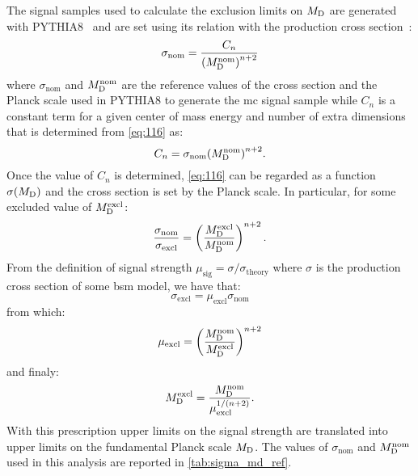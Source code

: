 The signal samples used to calculate the exclusion limits on $M_\mathrm{D}$ are generated
with PYTHIA8~\cite{PYTHIA8} and are set using its relation with the production
cross section~\cite{ADDPhenomenology}:
\begin{equation}
  \label{eq:116}
  \sigma_\mathrm{nom} = \frac{C_n}{{(M_\mathrm{D}^\mathrm{nom})}^{n + 2}}
\end{equation}
where $\sigma_\mathrm{nom}$ and $M_\mathrm{D}^\mathrm{nom}$ are the reference values of
the cross section and the Planck scale used in PYTHIA8 to generate the \gls{mc}
signal sample while $C_n$ is a constant term for a given center of mass energy
and number of extra dimensions that is determined from \cref{eq:116} as:
\begin{equation}
  \label{eq:179}
  C_n = \sigma_\mathrm{nom} {(M_\mathrm{D}^\mathrm{nom})}^{n + 2}.
\end{equation}
Once the value of $C_n$ is determined, \cref{eq:116} can be regarded as a
function $\sigma(M_\mathrm{D})$ and the cross section is set by the Planck scale. In
particular, for some excluded value of $M_\mathrm{D}^\mathrm{excl}$:
\begin{equation}
  \label{eq:180}
  \frac{\sigma_\mathrm{nom}}{\sigma_\mathrm{excl}} = \left(
    \frac{M_\mathrm{D}^\mathrm{excl}}{M_\mathrm{D}^\mathrm{nom}} \right)^{n + 2}.
\end{equation}
From the definition of signal strength
$\mu_\mathrm{sig} = \sigma/\sigma_\mathrm{theory}$ where $\sigma$ is the
production cross section of some \gls{bsm} model, we have that:
\begin{equation}
  \label{eq:181}
  \sigma_\mathrm{excl} = \mu_\mathrm{excl} \sigma_\mathrm{nom}
\end{equation}
from which:
\begin{equation}
  \label{eq:182}
  \mu_\mathrm{excl} = \left( \frac{M_\mathrm{D}^\mathrm{nom}}{M_\mathrm{D}^\mathrm{excl}}
  \right)^{n + 2}
\end{equation}
and finaly:
\begin{equation}
  \label{eq:117}
  M_\mathrm{D}^\mathrm{excl} = \frac{M_\mathrm{D}^\mathrm{nom}}{\mu^{1/(n + 2)}_\mathrm{excl}}.
\end{equation}
With this prescription upper limits on the signal strength are translated into
upper limits on the fundamental Planck scale $M_\mathrm{D}$. The values of
$\sigma_\mathrm{nom}$ and $M_\mathrm{D}^\mathrm{nom}$ used in this analysis are reported
in \cref{tab:sigma_md_ref}.
